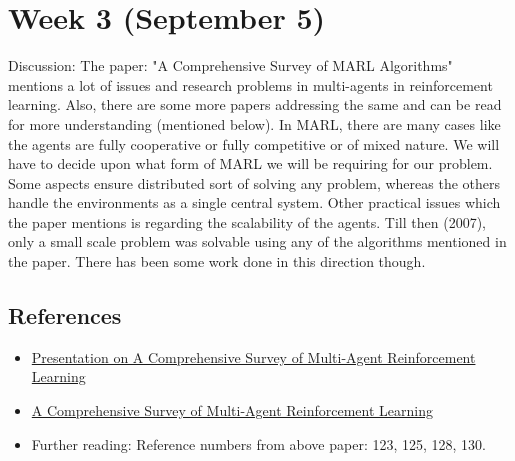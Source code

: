 \documentclass{article}
\begin{document}
\section{Week 3 (September 5) } 
	Discussion: The paper: "A Comprehensive Survey of MARL Algorithms" mentions a lot of issues and research problems in multi-agents in reinforcement learning. Also, there are some more papers addressing the same and can be read for more understanding (mentioned below). \newline 
	In MARL, there are many cases like the agents are fully cooperative or fully competitive or of mixed nature. We will have to decide upon what form of MARL we will be requiring for our problem. Some aspects ensure distributed sort of solving any problem, whereas the others handle the environments as a single central system. Other practical issues which the paper mentions is regarding the scalability of the agents. Till then (2007), only a small scale problem was solvable using any of the algorithms mentioned in the paper. There has been some work done in this direction though. 
	
	\subsection{References} 
	\begin{itemize}
		\item  \href{https://docs.google.com/presentation/d/1OhF0KokVcQkeHrQPxT7xzA1GClhjhw3srpNi-78n5Oc/edit?usp=sharing}{Presentation on A Comprehensive Survey of Multi-Agent Reinforcement Learning} 
		\item \href{https://ieeexplore.ieee.org/document/4445757/}{A Comprehensive Survey of Multi-Agent Reinforcement Learning} 
		\item Further reading: Reference numbers from above paper: 123, 125, 128, 130. 
	\end{itemize} 
	
\end{document}
